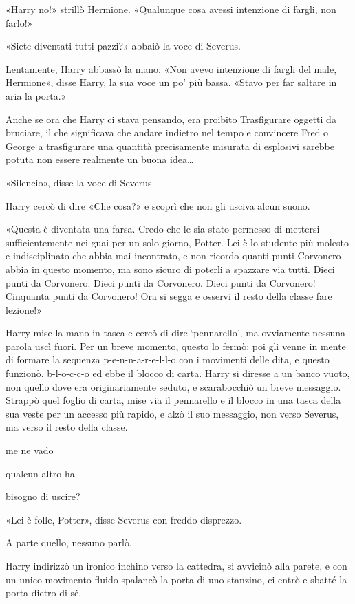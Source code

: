 «Harry no!» strillò Hermione. «Qualunque cosa avessi intenzione di fargli, non farlo!»

«Siete diventati tutti pazzi?» abbaiò la voce di Severus.

Lentamente, Harry abbassò la mano. «Non avevo intenzione di fargli del male, Hermione», disse Harry, la sua voce un po’ più bassa. «Stavo per far saltare in aria la porta.»

Anche se ora che Harry ci stava pensando, era proibito Trasfigurare oggetti da bruciare, il che significava che andare indietro nel tempo e convincere Fred o George a trasfigurare una quantità precisamente misurata di esplosivi sarebbe potuta non essere realmente un buona idea…

«Silencio», disse la voce di Severus.

Harry cercò di dire «Che cosa?» e scoprì che non gli usciva alcun suono.

«Questa è diventata una farsa. Credo che le sia stato permesso di mettersi sufficientemente nei guai per un solo giorno, Potter. Lei è lo studente più molesto e indisciplinato che abbia mai incontrato, e non ricordo quanti punti Corvonero abbia in questo momento, ma sono sicuro di poterli a spazzare via tutti. Dieci punti da Corvonero. Dieci punti da Corvonero. Dieci punti da Corvonero! Cinquanta punti da Corvonero! Ora si segga e osservi il resto della classe fare lezione!»

Harry mise la mano in tasca e cercò di dire ‘pennarello’, ma ovviamente nessuna parola uscì fuori. Per un breve momento, questo lo fermò; poi gli venne in mente di formare la sequenza p-e-n-n-a-r-e-l-l-o con i movimenti delle dita, e questo funzionò. b-l-o-c-c-o ed ebbe il blocco di carta. Harry si diresse a un banco vuoto, non quello dove era originariamente seduto, e scarabocchiò un breve messaggio. Strappò quel foglio di carta, mise via il pennarello e il blocco in una tasca della sua veste per un accesso più rapido, e alzò il suo messaggio, non verso Severus, ma verso il resto della classe.

me ne vado

qualcun altro ha

bisogno di uscire?

«Lei è folle, Potter», disse Severus con freddo disprezzo.

A parte quello, nessuno parlò.

Harry indirizzò un ironico inchino verso la cattedra, si avvicinò alla parete, e con un unico movimento fluido spalancò la porta di uno stanzino, ci entrò e sbatté la porta dietro di sé.

